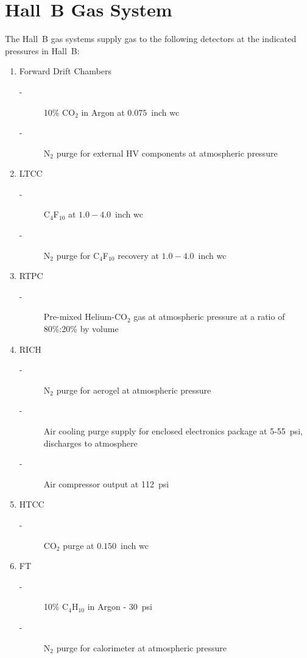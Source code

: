 \section{Hall~B Gas System}

The Hall~B gas systems supply gas to the following detectors at the indicated pressures 
in Hall~B:
\begin{enumerate}
\item Forward Drift Chambers 
\begin{description}
\item[-] 10\% CO$_2$ in Argon at $0.075$~inch wc
\item[-] N$_2$ purge for external HV components at atmospheric pressure
\end{description}
\item LTCC 
\begin{description}
\item[-] C$_4$F$_{10}$ at $1.0 - 4.0$~inch wc
\item[-] N$_2$ purge for C$_4$F$_{10}$ recovery at $1.0-4.0$~inch wc
\end{description}
\item RTPC
\begin{description}
\item[-]  Pre-mixed Helium-CO$_2$ gas at atmospheric pressure at a ratio of 80\%:20\% by volume
\end{description}
\item RICH 
\begin{description}
\item[-] N$_2$ purge for aerogel at atmospheric pressure
\item[-] Air cooling purge supply for enclosed electronics package at 5-55~psi, discharges to atmosphere
\item[-] Air compressor output at 112~psi 
\end{description}
\item HTCC 
\begin{description}
\item[-] CO$_2$ purge at $0.150$~inch wc 
\end{description}
\item FT 
\begin{description}
\item[-] 10\% C$_4$H$_{10}$ in Argon - 30~psi
\item[-] N$_2$ purge for calorimeter at atmospheric pressure 
\end{description}
\end{enumerate}

